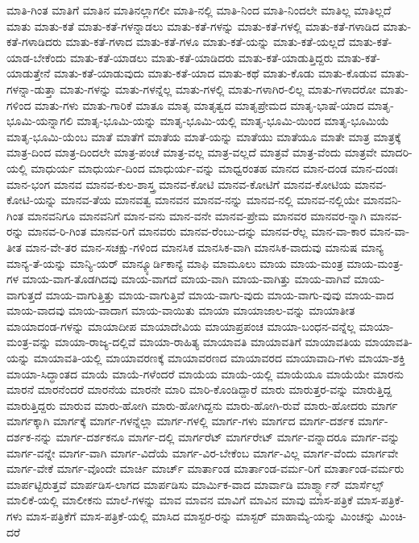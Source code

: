 {ಮಾತಿ-ಗಿಂತ
ಮಾತಿಗೆ
ಮಾತಿನ
ಮಾತಿನಲ್ಲಾಗಲೀ
ಮಾತಿ-ನಲ್ಲಿ
ಮಾತಿ-ನಿಂದ
ಮಾತಿ-ನಿಂದಲೇ
ಮಾತಿಲ್ಲ
ಮಾತಿಲ್ಲದೆ
ಮಾತು
ಮಾತು-ಕತೆ
ಮಾತು-ಕತೆ-ಗಳನ್ನಾಡಲು
ಮಾತು-ಕತೆ-ಗಳನ್ನು
ಮಾತು-ಕತೆ-ಗಳಲ್ಲಿ
ಮಾತು-ಕತೆ-ಗಳಾಡಿದ
ಮಾತು-ಕತೆ-ಗಳಾಡಿದರು
ಮಾತು-ಕತೆ-ಗಳಾದ
ಮಾತು-ಕತೆ-ಗಳೂ
ಮಾತು-ಕತೆ-ಯನ್ನು
ಮಾತು-ಕತೆ-ಯಲ್ಲದೆ
ಮಾತು-ಕತೆ-ಯಾಡ-ಬೇಕೆಂದು
ಮಾತು-ಕತೆ-ಯಾಡಲು
ಮಾತು-ಕತೆ-ಯಾಡಿದರು
ಮಾತು-ಕತೆ-ಯಾಡುತ್ತಿದ್ದರು
ಮಾತು-ಕತೆ-ಯಾಡುತ್ತೇನೆ
ಮಾತು-ಕತೆ-ಯಾಡುವುದು
ಮಾತು-ಕತೆ-ಯಾದ
ಮಾತು-ಕಥೆ
ಮಾತು-ಕೊಡು
ಮಾತು-ಕೊಡುವ
ಮಾತು-ಗಳನ್ನಾ-ಡುತ್ತಾ
ಮಾತು-ಗಳನ್ನು
ಮಾತು-ಗಳನ್ನೆಲ್ಲ
ಮಾತು-ಗಳಲ್ಲಿ
ಮಾತು-ಗಳಾಗಿರ-ಲಿಲ್ಲ
ಮಾತು-ಗಳಾದರೋ
ಮಾತು-ಗಳಿಂದ
ಮಾತು-ಗಳು
ಮಾತು-ಗಾರಿಕೆ
ಮಾತೂ
ಮಾತೃ
ಮಾತೃತ್ವದ
ಮಾತೃಪ್ರೇಮದ
ಮಾತೃ-ಭಾಷೆ-ಯಾದ
ಮಾತೃ-ಭೂಮಿ-ಯನ್ನಾಗಲಿ
ಮಾತೃ-ಭೂಮಿ-ಯನ್ನು
ಮಾತೃ-ಭೂಮಿ-ಯಲ್ಲಿ
ಮಾತೃ-ಭೂಮಿ-ಯಿಂದ
ಮಾತೃ-ಭೂಮಿಯೆ
ಮಾತೃ-ಭೂಮಿ-ಯೆಂಬ
ಮಾತೆ
ಮಾತೆಗೆ
ಮಾತೆಯ
ಮಾತೆ-ಯನ್ನು
ಮಾತೆಯು
ಮಾತೆಯೂ
ಮಾತೇ
ಮಾತ್ರ
ಮಾತ್ರಕ್ಕೆ
ಮಾತ್ರ-ದಿಂದ
ಮಾತ್ರ-ದಿಂದಲೇ
ಮಾತ್ರ-ಪಂಚೆ
ಮಾತ್ರ-ವಲ್ಲ
ಮಾತ್ರ-ವಲ್ಲದೆ
ಮಾತ್ರವೆ
ಮಾತ್ರ-ವೆಂದು
ಮಾತ್ರವೇ
ಮಾದರಿ-ಯಲ್ಲಿ
ಮಾಧುರ್ಯ
ಮಾಧುರ್ಯ-ದಿಂದ
ಮಾಧುರ್ಯ-ವನ್ನು
ಮಾಧ್ವರಂತಹ
ಮಾನದ
ಮಾನ-ದಂಡ
ಮಾನ-ದಂಡಃ
ಮಾನ-ಭಂಗ
ಮಾನವ
ಮಾನವ-ಕುಲ-ಶಾಸ್ತ್ರ
ಮಾನವ-ಕೋಟಿ
ಮಾನವ-ಕೋಟಿಗೆ
ಮಾನವ-ಕೋಟಿಯ
ಮಾನವ-ಕೋಟಿ-ಯನ್ನು
ಮಾನವ-ತೆಯ
ಮಾನವತ್ವ
ಮಾನವನ
ಮಾನವ-ನನ್ನು
ಮಾನವ-ನಲ್ಲಿ
ಮಾನವ-ನಲ್ಲಿಯೇ
ಮಾನವನಿ-ಗಿಂತ
ಮಾನವನಿಗೂ
ಮಾನವನಿಗೆ
ಮಾನ-ವನು
ಮಾನ-ವನೇ
ಮಾನವ-ಪ್ರೇಮ
ಮಾನವರ
ಮಾನವರ-ನ್ನಾಗಿ
ಮಾನವ-ರನ್ನು
ಮಾನವ-ರಿ-ಗಿಂತ
ಮಾನವ-ರಿಗೆ
ಮಾನವರು
ಮಾನವ-ರೆಂಬು-ದನ್ನು
ಮಾನವ-ರೆಲ್ಲ
ಮಾನ-ವಾ-ಕಾರ
ಮಾನ-ವಾ-ತೀತ
ಮಾನ-ವೇ-ತರ
ಮಾನ-ಸಚಕ್ಷು-ಗಳಿಂದ
ಮಾನಸಿಕ
ಮಾನಸಿಕ-ವಾಗಿ
ಮಾನಸಿಕ-ವಾದುವು
ಮಾನುಷ
ಮಾನ್ಯ
ಮಾನ್ಯ-ತೆ-ಯನ್ನು
ಮಾನ್ಯಿ-ಯರ್
ಮಾನ್ಕ್ಯೂರ್ಡಿಕಾನ್ಯೆ
ಮಾಫಿ
ಮಾಮೂಲು
ಮಾಯ
ಮಾಯ-ಮಂತ್ರ
ಮಾಯ-ಮಂತ್ರ-ಗಳ
ಮಾಯ-ವಾಗ-ತೊಡಗಿದವು
ಮಾಯ-ವಾಗದೆ
ಮಾಯ-ವಾಗಿ
ಮಾಯ-ವಾಗಿತ್ತು
ಮಾಯ-ವಾಗಿವೆ
ಮಾಯ-ವಾಗುತ್ತದೆ
ಮಾಯ-ವಾಗುತ್ತಿತ್ತು
ಮಾಯ-ವಾಗುತ್ತಿವೆ
ಮಾಯ-ವಾಗು-ವುದು
ಮಾಯ-ವಾಗು-ವುವು
ಮಾಯ-ವಾದ
ಮಾಯ-ವಾದವು
ಮಾಯ-ವಾದಾಗ
ಮಾಯ-ವಾಯಿತು
ಮಾಯಾ
ಮಾಯಾಜಾಲ-ವನ್ನು
ಮಾಯಾತೀತ
ಮಾಯಾದಂಡ-ಗಳನ್ನು
ಮಾಯಾದೀಪ
ಮಾಯಾದೇವಿಯ
ಮಾಯಾಪ್ರಪಂಚ
ಮಾಯಾ-ಬಂಧನ-ವನ್ನೆಲ್ಲ
ಮಾಯಾ-ಮಂತ್ರ-ವನ್ನು
ಮಾಯಾ-ರಾಜ್ಯ-ದಲ್ಲಿವೆ
ಮಾಯಾ-ರಾಹಿತ್ಯ
ಮಾಯಾವತಿ
ಮಾಯಾವತಿಗೆ
ಮಾಯಾವತಿಯ
ಮಾಯಾವತಿ-ಯನ್ನು
ಮಾಯಾವತಿ-ಯಲ್ಲಿ
ಮಾಯಾವರಣಕ್ಕೆ
ಮಾಯಾವರಣದ
ಮಾಯಾವರದ
ಮಾಯಾವಾದಿ-ಗಳು
ಮಾಯಾ-ಶಕ್ತಿ
ಮಾಯಾ-ಸಿದ್ಧಾಂತದ
ಮಾಯೆ
ಮಾಯೆ-ಗಳೆಂದರೆ
ಮಾಯೆಯ
ಮಾಯೆ-ಯಲ್ಲಿ
ಮಾಯೆಯೂ
ಮಾಯೆಯೇ
ಮಾರನು
ಮಾರನೆ
ಮಾರನೆಂದರೆ
ಮಾರನೆಯ
ಮಾರನೇ
ಮಾರಿ
ಮಾರಿ-ಕೊಂಡಿದ್ದಾರೆ
ಮಾರು
ಮಾರುತ್ತರ-ವನ್ನು
ಮಾರುತ್ತಿದ್ದ
ಮಾರುತ್ತಿದ್ದರು
ಮಾರುವ
ಮಾರು-ಹೋಗಿ
ಮಾರು-ಹೋಗಿದ್ದನು
ಮಾರು-ಹೋಗಿ-ರುವೆ
ಮಾರು-ಹೋದರು
ಮಾರ್ಗ
ಮಾರ್ಗಕ್ಕಾಗಿ
ಮಾರ್ಗಕ್ಕೆ
ಮಾರ್ಗ-ಗಳನ್ನೆಲ್ಲಾ
ಮಾರ್ಗ-ಗಳಲ್ಲಿ
ಮಾರ್ಗ-ಗಳು
ಮಾರ್ಗದ
ಮಾರ್ಗ-ದರ್ಶಕ
ಮಾರ್ಗ-ದರ್ಶಕ-ನನ್ನು
ಮಾರ್ಗ-ದರ್ಶಕನೂ
ಮಾರ್ಗ-ದಲ್ಲಿ
ಮಾರ್ಗರೆಟ್
ಮಾರ್ಗರೇಟ್
ಮಾರ್ಗ-ವನ್ನಾದರೂ
ಮಾರ್ಗ-ವನ್ನು
ಮಾರ್ಗ-ವನ್ನೇ
ಮಾರ್ಗ-ವಾಗಿ
ಮಾರ್ಗ-ವಿದೆಯೆ
ಮಾರ್ಗ-ವಿರ-ಬೇಕೆಂಬ
ಮಾರ್ಗ-ವಿಲ್ಲ
ಮಾರ್ಗ-ವೆಂದು
ಮಾರ್ಗವೇ
ಮಾರ್ಗ-ವೇಕೆ
ಮಾರ್ಗ-ವೊಂದೇ
ಮಾರ್ಚಿ
ಮಾರ್ಚ್
ಮಾರ್ತಾಂಡ
ಮಾರ್ತಾಂಡ-ವರ್ಮ-ರಿಗೆ
ಮಾರ್ತಾಂಡ-ವರ್ಮರು
ಮಾರ್ಪಟ್ಟಿರುತ್ತವೆ
ಮಾರ್ಪಡಿಸ-ಲಾಗದ
ಮಾರ್ಪಡಿಸು
ಮಾರ್ಮಿಕ-ವಾದ
ಮಾರ್ವಾಡಿ
ಮಾರ್ಶ್ಮ್ಯಾನ್
ಮಾರ್ಸೆಲ್ಸ್
ಮಾಲಿಕೆ-ಯಲ್ಲಿ
ಮಾಲೀಕನು
ಮಾಲೆ-ಗಳನ್ನು
ಮಾವ
ಮಾವನ
ಮಾವಿಗೆ
ಮಾವಿನ
ಮಾವು
ಮಾಸ-ಪತ್ರಿಕೆ
ಮಾಸ-ಪತ್ರಿಕೆ-ಗಳು
ಮಾಸ-ಪತ್ರಿಕೆಗೆ
ಮಾಸ-ಪತ್ರಿಕೆ-ಯಲ್ಲಿ
ಮಾಸಿದ
ಮಾಸ್ಟರ-ರನ್ನು
ಮಾಸ್ಟರ್
ಮಾಹಾಮ್ಯೆ-ಯನ್ನು
ಮಿಂಚನ್ನು
ಮಿಂಚಿ-ದರೆ
}

